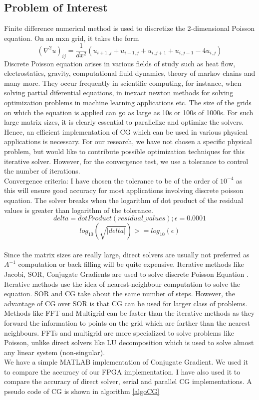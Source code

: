 \documentclass{article}
\begin{document}
\begin{spacing}{1.1}
\section{Problem of Interest}

    Finite difference numerical method is used to discretize the 2-dimensional Poisson equation. On an m{x}n grid, it takes the form
\[(\nabla^2	u)_{ij} = \dfrac{1}{dx^2}(u_{i+1,j} + u_{i-1,j} + u_{i,j+1} + u_{i,j-1} - 4u_{i,j} ) \] 
	Discrete Poisson equation arises in various fields of study such as heat flow, electrostatics, gravity, computational fluid dynamics, theory of markov chains and many more. They occur frequently in scientific computing, for instance, when solving partial diferential equations, in inexact newton methods for solving optimization problems in machine learning applications etc. The size of the grids on which the equation is applied can go as large as 10s or 100s of 1000s. For such large matrix sizes, it is clearly essential to parallelize and optimize the solvers. Hence, an efficient implementation of CG which can be used in various physical applications is necessary. For our research, we have not chosen a specific physical problem, but would like to contribute possible optimization techniques for this iterative solver. However, for the convergence test, we use a tolerance to control the number of iterations. \\
	Convergence criteria: I have chosen the tolerance to be of the order of $10^{-4}$ as this will ensure good accuracy for most applications involving discrete poisson equation. 
	The solver breaks when the logarithm of dot product of the residual values is greater than logarithm of the tolerance.
\[ delta = dotProduct(residual\_values); \epsilon = 0.0001 \]
\[ log_{10}(\sqrt{|delta|}) >= log_{10}(\epsilon) \] 
\\
	Since the matrix sizes are really large, direct solvers are usually not preferred as $A^{-1}$ computation or back filling will be quite expensive. Iterative methods like  Jacobi, SOR, Conjugate Gradients are used to solve discrete Poisson Equation \cite{Berkley1996}. Iterative methods use the idea of nearest-neighbour computation to solve the equation. SOR and CG take about the same number of steps. However, the advantage of CG over SOR is that CG can be used for larger class of problems. Methods like FFT and Multigrid can be faster than the iterative methods as they forward the information to points on the grid which are farther than the nearest neighbours. FFTs and multigrid are more specialized to solve problems like Poisson, unlike direct solvers like LU decomposition which is used to solve almost any linear system (non-singular). \cite{FFTPoisson}
	\\
	We have a simple MATLAB implementation of Conjugate Gradient. We used it to compare the accuracy of our FPGA implementation. I have also used it to compare the accuracy of direct solver, serial and parallel CG implementations. A pseudo code of CG is shown in algorithm \ref{algoCG}
	

\end{spacing}
\end{document}
